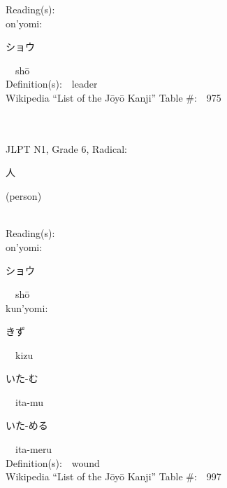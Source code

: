 \begin{multicols}{2}
Reading(s):\ \ \\
{\hspace*{1em}}on'yomi:\ \ \\
{\hspace*{2em}}{\begin{CJK}{UTF8}{min} ショウ \end{CJK}}\ \ sh\=o\ \ \\
Definition(s):\ \ leader \\
Wikipedia ``List of the J\=oy\=o Kanji'' Table \#:\ \ 975 \\
\ \ \\
{\fontsize{34pt}{40pt}  }\ \ \\  %
{JLPT N1, Grade 6, Radical:\ \ {\begin{CJK}{UTF8}{min} 人 \end{CJK}} (person) } \\
Reading(s):\ \ \\
{\hspace*{1em}}on'yomi:\ \ \\
{\hspace*{2em}}{\begin{CJK}{UTF8}{min} ショウ \end{CJK}}\ \ sh\=o\ \ \\
{\hspace*{1em}}kun'yomi:\ \ \\
{\hspace*{2em}}{\begin{CJK}{UTF8}{min} きず \end{CJK}}\ \ kizu\ \ \\
{\hspace*{2em}}{\begin{CJK}{UTF8}{min} いた-む \end{CJK}}\ \ ita-mu\ \ \\
{\hspace*{2em}}{\begin{CJK}{UTF8}{min} いた-める \end{CJK}}\ \ ita-meru\ \ \\
Definition(s):\ \ wound \\
Wikipedia ``List of the J\=oy\=o Kanji'' Table \#:\ \ 997 \\
\ \ \\
{\fontsize{34pt}{40pt}  }\ \ \\  %

\end{multicols}
